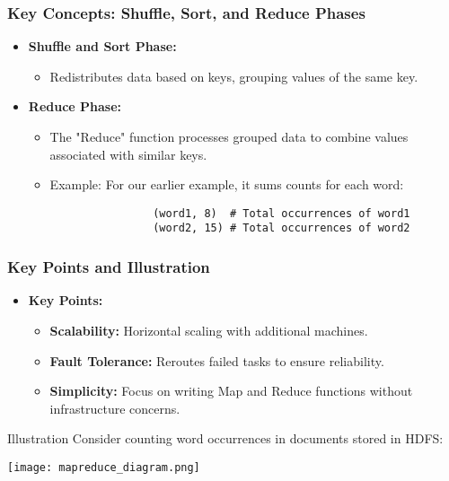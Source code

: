 \documentclass[aspectratio=169]{beamer}
\begin{document}
\begin{frame}[fragile]
    \frametitle{Key Concepts: Shuffle, Sort, and Reduce Phases}
    \begin{itemize}
        \item \textbf{Shuffle and Sort Phase:} 
        \begin{itemize}
            \item Redistributes data based on keys, grouping values of the same key.
        \end{itemize}
        
        \item \textbf{Reduce Phase:}
        \begin{itemize}
            \item The "Reduce" function processes grouped data to combine values associated with similar keys.
            \item Example: For our earlier example, it sums counts for each word:
            \begin{lstlisting}
                (word1, 8)  # Total occurrences of word1
                (word2, 15) # Total occurrences of word2
            \end{lstlisting}
        \end{itemize}
    \end{itemize}
\end{frame}

\begin{frame}[fragile]
    \frametitle{Key Points and Illustration}
    \begin{itemize}
        \item \textbf{Key Points:}
        \begin{itemize}
            \item \textbf{Scalability:} Horizontal scaling with additional machines.
            \item \textbf{Fault Tolerance:} Reroutes failed tasks to ensure reliability.
            \item \textbf{Simplicity:} Focus on writing Map and Reduce functions without infrastructure concerns.
        \end{itemize}
    \end{itemize}

    \begin{block}{Illustration}
    Consider counting word occurrences in documents stored in HDFS:
    
    \begin{center}
    \texttt{[image: mapreduce\_diagram.png]}
    \end{center}
    \end{block}
\end{frame}
\end{document}
